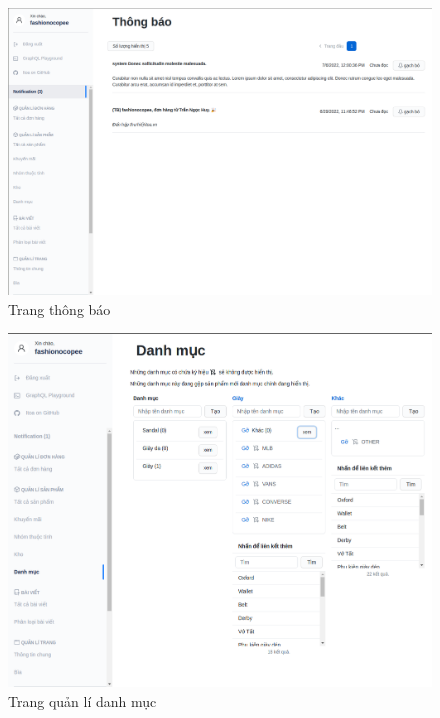 \begin{figure}[!htbp]\fontsize{13px}{13px}\selectfont
	\begin{center}	
		\includegraphics[width=\textwidth]{./results/notifications}
		\caption{Trang thông báo}
	\end{center}
\end{figure}
\clearpage
\FloatBarrier
\begin{figure}[!htbp]\fontsize{13px}{13px}\selectfont
	\begin{center}	
		\includegraphics[width=\textwidth]{./results/categories}
		\caption{Trang quản lí danh mục}
	\end{center}
\end{figure}
